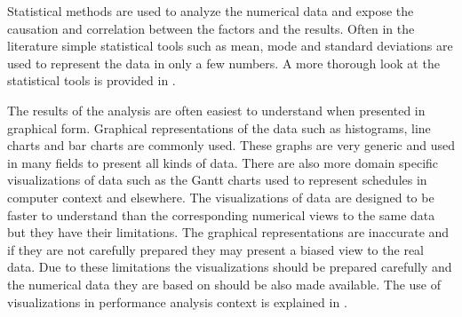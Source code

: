 Statistical methods are used to analyze the numerical data and expose the
causation and correlation between the factors and the results. Often in the
literature simple statistical tools such as mean, mode and standard deviations
are used to represent the data in only a few numbers. A more thorough look at
the statistical tools is provided in \cite{jain1991art}. 

The results of the analysis are often easiest to understand when presented in
graphical form. Graphical representations of the data such as histograms, line
charts and bar charts are commonly used. These graphs are very generic and used
in many fields to present all kinds of data. There are also more domain specific
visualizations of data such as the Gantt charts used to represent schedules in
computer context and elsewhere. The visualizations of data are designed to be
faster to understand than the corresponding numerical views to the same data but
they have their limitations. The graphical representations are inaccurate and if
they are not carefully prepared they may present a biased view to the real data.
Due to these limitations the visualizations should be prepared carefully and the
numerical data they are based on should be also made available. The use of
visualizations in performance analysis context is explained in
\cite{jain1991art}. 



